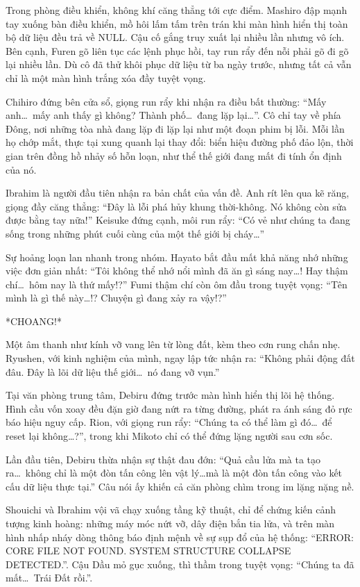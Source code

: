 \documentclass[../main.tex]{subfiles}
\begin{document}
Trong phòng điều khiển, không khí căng thẳng tới cực điểm. Mashiro đập mạnh tay xuống bàn điều khiển, mồ hôi lấm tấm trên trán khi màn hình hiển thị toàn bộ dữ liệu đều trả về NULL. Cậu cố gắng truy xuất lại nhiều lần nhưng vô ích. Bên cạnh, Furen gõ liên tục các lệnh phục hồi, tay run rẩy đến nỗi phải gõ đi gõ lại nhiều lần. Dù cô đã thử khôi phục dữ liệu từ ba ngày trước, nhưng tất cả vẫn chỉ là một màn hình trắng xóa đầy tuyệt vọng.

Chihiro đứng bên cửa sổ, giọng run rẩy khi nhận ra điều bất thường: ``Mấy anh\dots\ mấy anh thấy gì không? Thành phố\dots\ đang lặp lại\dots''. Cô chỉ tay về phía Đông, nơi những tòa nhà đang lặp đi lặp lại như một đoạn phim bị lỗi. Mỗi lần họ chớp mắt, thực tại xung quanh lại thay đổi: biển hiệu đường phố đảo lộn, thời gian trên đồng hồ nhảy số hỗn loạn, như thể thế giới đang mất đi tính ổn định của nó.

Ibrahim là người đầu tiên nhận ra bản chất của vấn đề. Anh rít lên qua kẽ răng, giọng đầy căng thẳng: ``Đây là lỗi phá hủy khung thời-không. Nó không còn sửa được bằng tay nữa!'' Keisuke đứng cạnh, môi run rẩy: ``Có vẻ như chúng ta đang sống trong những phút cuối cùng của một thế giới bị cháy\dots''

Sự hoảng loạn lan nhanh trong nhóm. Hayato bắt đầu mất khả năng nhớ những việc đơn giản nhất: ``Tôi không thể nhớ nổi mình đã ăn gì sáng nay\dots! Hay thậm chí\dots\ hôm nay là thứ mấy!?'' Fumi thậm chí còn ôm đầu trong tuyệt vọng: ``Tên mình là gì thế này\dots!? Chuyện gì đang xảy ra vậy!?''

*CHOANG!*

Một âm thanh như kính vỡ vang lên từ lòng đất, kèm theo cơn rung chấn nhẹ. Ryushen, với kinh nghiệm của mình, ngay lập tức nhận ra: ``Không phải động đất đâu. Đây là lõi dữ liệu thế giới\dots\ nó đang vỡ vụn.''

Tại văn phòng trung tâm, Debiru đứng trước màn hình hiển thị lõi hệ thống. Hình cầu vốn xoay đều đặn giờ đang nứt ra từng đường, phát ra ánh sáng đỏ rực báo hiệu nguy cấp. Rion, với giọng run rẩy: ``Chúng ta có thể làm gì đó\dots\ để reset lại không\dots?'', trong khi Mikoto chỉ có thể đứng lặng người sau cơn sốc.

Lần đầu tiên, Debiru thừa nhận sự thật đau đớn: ``Quả cầu lửa mà ta tạo ra\dots\ không chỉ là một đòn tấn công lên vật lý\dots mà là một đòn tấn công vào kết cấu dữ liệu thực tại.'' Câu nói ấy khiến cả căn phòng chìm trong im lặng nặng nề.

Shouichi và Ibrahim vội vã chạy xuống tầng kỹ thuật, chỉ để chứng kiến cảnh tượng kinh hoàng: những máy móc nứt vỡ, dây điện bắn tia lửa, và trên màn hình nhấp nháy dòng thông báo định mệnh về sự sụp đổ của hệ thống: ``ERROR: CORE FILE NOT FOUND. SYSTEM STRUCTURE COLLAPSE DETECTED.''. Cậu Dầu mỏ gục xuống, thì thầm trong tuyệt vọng: ``Chúng ta đã mất\dots\ Trái Đất rồi.''.
\end{document}
